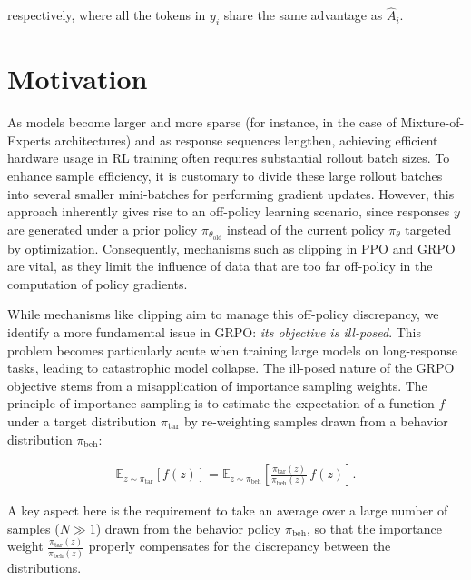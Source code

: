 respectively, where all the tokens in $y_i$ share the same advantage as $\widehat{A}_{i}$.

\section{Motivation}
\label{sec:motivation}

As models become larger and more sparse (for instance, in the case of Mixture-of-Experts architectures) and as response sequences lengthen, achieving efficient hardware usage in RL training often requires substantial rollout batch sizes. To enhance sample efficiency, it is customary to divide these large rollout batches into several smaller mini-batches for performing gradient updates. However, this approach inherently gives rise to an off-policy learning scenario, since responses $y$ are generated under a prior policy $\pi_{\theta_\text{old}}$ instead of the current policy $\pi_\theta$ targeted by optimization. Consequently, mechanisms such as clipping in PPO and GRPO are vital, as they limit the influence of data that are too far off-policy in the computation of policy gradients.

While mechanisms like clipping aim to manage this off-policy discrepancy, we identify a more fundamental issue in GRPO: \textit{its objective is ill-posed}. This problem becomes particularly acute when training large models on long-response tasks, leading to catastrophic model collapse. The ill-posed nature of the GRPO objective stems from a misapplication of importance sampling weights. The principle of importance sampling is to estimate the expectation of a function $f$ under a target distribution $\pi_\text{tar}$ by re-weighting samples drawn from a behavior distribution $\pi_\text{beh}$:

\begin{align}
\mathbb{E}_{z \sim \pi_\text{tar}} \left[ f(z) \right] = \mathbb{E}_{z \sim \pi_\text{beh}} \left[ \frac{ \pi_\text{tar} (z) }{ \pi_\text{beh} (z)} \, f(z) \right].
\end{align}

A key aspect here is the requirement to take an average over a large number of samples ($N \gg 1$) drawn from the behavior policy $\pi_\text{beh}$, so that the importance weight $\frac{ \pi_\text{tar} (z) }{ \pi_\text{beh} (z)}$ properly compensates for the discrepancy between the distributions.


